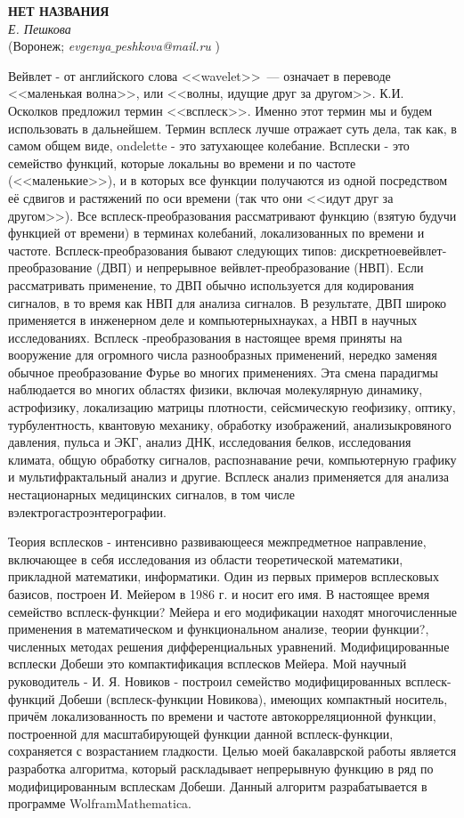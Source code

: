 \begin{center}{ \bf  НЕТ НАЗВАНИЯ}\\
{\it Е. Пешкова } \\
(Воронеж; {\it evgenya$\_$peshkova@mail.ru} )
\end{center}

Вейвлет - от английского слова <<wavelet>>~--- означает в переводе <<маленькая волна>>, или <<волны, идущие друг за другом>>. К.И. Осколков предложил термин <<всплеск>>. Именно этот термин мы и будем использовать в дальнейшем. Термин всплеск лучше отражает суть дела, так как, в самом общем виде, ondelette - это затухающее колебание.
Всплески - это семейство функций, которые локальны во времени и по частоте (<<маленькие>>), и в которых все функции получаются из одной посредством её сдвигов и растяжений по оси времени (так что они <<идут друг за другом>>).
Все всплеск-преобразования рассматривают функцию (взятую будучи функцией от времени) в терминах колебаний, локализованных по времени и частоте. Всплеск-преобразования бывают следующих типов: дискретноевейвлет-преобразование (ДВП) и непрерывное вейвлет-преобразование (НВП).
Если рассматривать применение, то ДВП обычно используется для кодирования сигналов, в то время как НВП для анализа сигналов. В результате, ДВП широко применяется в инженерном деле и компьютерныхнауках, а НВП в научных исследованиях. Всплеск -преобразования в настоящее время приняты на вооружение для огромного числа разнообразных применений, нередко заменяя обычное преобразование Фурье во многих применениях. Эта смена парадигмы наблюдается во многих областях физики, включая молекулярную динамику, астрофизику, локализацию матрицы плотности, сейсмическую геофизику, оптику, турбулентность, квантовую механику, обработку изображений, анализыкровяного давления, пульса и ЭКГ, анализ ДНК, исследования белков, исследования климата, общую обработку сигналов, распознавание речи, компьютерную графику и мультифрактальный анализ и другие. Всплеск анализ применяется для анализа нестационарных медицинских сигналов, в том числе вэлектрогастроэнтерографии.

Теория всплесков - интенсивно развивающееся межпредметное направление, включающее в себя исследования из области теоретической математики, прикладной математики, информатики. Один из первых примеров всплесковых базисов, построен И. Мейером в 1986 г. и носит его имя. В настоящее время семейство всплеск-функции? Мейера и его модификации находят многочисленные применения в математическом и функциональном анализе, теории функции?, численных методах решения дифференциальных уравнений.
Модифицированные всплески Добеши это компактификация всплесков Мейера.
Мой научный руководитель - И. Я. Новиков - построил семейство модифицированных всплеск-функций Добеши (всплеск-функции Новикова), имеющих компактный носитель, причём локализованность по времени и частоте автокорреляционной функции, построенной для масштабирующей функции данной всплеск-функции, сохраняется с возрастанием гладкости. Целью моей бакалаврской работы является разработка алгоритма, который раскладывает непрерывную функцию в ряд по модифицированным всплескам Добеши. Данный алгоритм разрабатывается в программе WolframMathematica.
